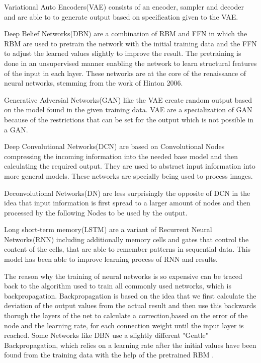 \documentclass[conference]{IEEEtran}
\begin{document}
Variational Auto Encoders(VAE) consists of an encoder, sampler and decoder and are able to to generate output based on specification given to the VAE. 

Deep Belief Networks(DBN) are a combination of RBM and FFN in which the RBM are used to pretrain the network with the initial training 
data and the FFN to adjust the learned values slightly to improve the result. The pretraining is done in an unsupervised manner enabling the network to learn structural features of the input in each layer. These networks are at the core of the renaissance of neural networks, stemming from the work of Hinton 2006\cite{hinton2006fast}.

Generative Adversial Networks(GAN) like the VAE create random output based on the model found in the given training data. VAE are a specialization of GAN because of the restrictions that can be set for the output which is not possible in a GAN.

Deep Convolutional Networks(DCN) are based on Convolutional Nodes compressing the incoming information into the needed base model and then calculating the required output\cite{PattersonGibson17}. They are used to abstract input information into more general models. These networks are specially being used to process images.

Deconvolutional Networks(DN)\cite{zeiler2014visualizing} are less surprisingly the opposite of DCN in the idea that input information is first spread to a larger amount of nodes and then processed by the following Nodes to be used by the output.

Long short-term memory(LSTM)\cite{hochreiter1997long} are a variant of Recurrent Neural Networks(RNN) including additionally memory cells and gates that control the content of the cells, that are able to remember patterns in sequential data. This model has been able to improve learning process of RNN and results.


The reason why the training of neural networks is so expensive can be traced back to the algorithm used to train all commonly used networks, which is backpropagation. Backpropagation is based on the idea that we first calculate the deviation of the output values from the actual result and then use this backwards thorugh the layers of the net to calculate a correction,based on the error of the node and the learning rate, for each connection weight until the input layer is reached\cite{riedmiller1993direct}. Some Networks like DBN use a slightly 
different "Gentle" Backpropagation, which relies on a learning rate after the initial values have been found from the training data with the help of the pretrained RBM \cite{PattersonGibson17}.
\end{document}
